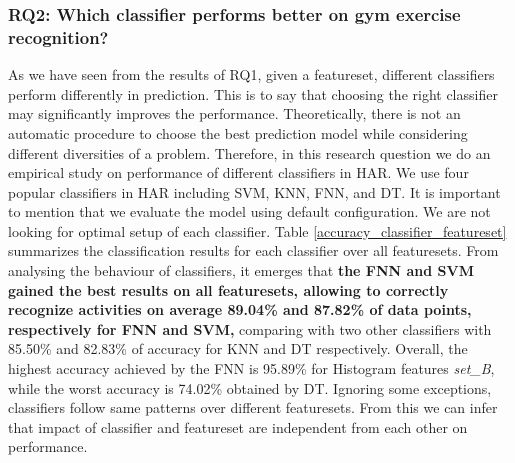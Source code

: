 \documentclass[journal,article,submit,moreauthors,pdftex]{Definitions/mdpi}
\newcommand{\hosein}[1]{\textcolor{orange}{{\it [Hosein: #1]}}}
\begin{document}
\subsubsection{RQ2: Which classifier performs better on gym exercise recognition?}
As we have seen from the results of RQ1, given a featureset, different classifiers perform differently in prediction. This is to say that choosing the right classifier may significantly improves the performance. Theoretically, there is not an automatic procedure to choose the best prediction model while considering different diversities of a problem. Therefore, in this research question we do an empirical study on performance of different classifiers in HAR. We use four popular classifiers in HAR including SVM, KNN, FNN, and DT. It is important to mention that we evaluate the model using default configuration. We are not looking for optimal setup of each classifier. Table \ref{accuracy_classifier_featureset} summarizes the classification results for each classifier over all featuresets.  From analysing the behaviour of classifiers, it emerges that \textbf{the FNN and SVM gained the best results on all featuresets, allowing to correctly recognize activities on average 89.04\% and 87.82\% of data points, respectively for FNN and SVM,} comparing with two other classifiers with 85.50\% and 82.83\% of accuracy for KNN and DT respectively. Overall, the highest accuracy achieved by the FNN is 95.89\% for Histogram features \textit{set\_B}, while the worst accuracy is 74.02\% obtained by DT. Ignoring some exceptions, classifiers follow same patterns over different featuresets. From this we can infer that impact of classifier and featureset are independent from each other on performance.
\end{document}
